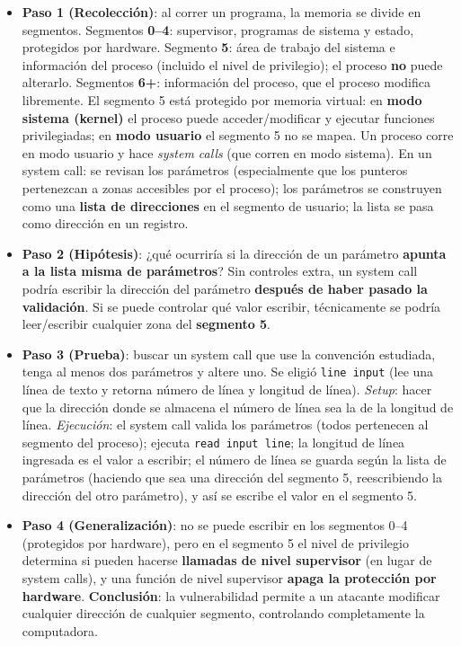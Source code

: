 \documentclass[../main.tex]{subfiles}
\begin{document}
\begin{itemize}
    \item \textbf{Paso 1 (Recolección)}: al correr un programa, la memoria se divide en
    segmentos. Segmentos \textbf{0--4}: supervisor, programas de sistema y estado, protegidos
    por hardware. Segmento \textbf{5}: área de trabajo del sistema e información del proceso
    (incluido el nivel de privilegio); el proceso \textbf{no} puede alterarlo. Segmentos
    \textbf{6+}: información del proceso, que el proceso modifica libremente. El segmento 5
    está protegido por memoria virtual: en \textbf{modo sistema (kernel)} el proceso puede
    acceder/modificar y ejecutar funciones privilegiadas; en \textbf{modo usuario} el segmento
    5 no se mapea. Un proceso corre en modo usuario y hace \emph{system calls} (que corren en
    modo sistema). En un system call: se revisan los parámetros (especialmente que los
    punteros pertenezcan a zonas accesibles por el proceso); los parámetros se construyen como
    una \textbf{lista de direcciones} en el segmento de usuario; la lista se pasa como
    dirección en un registro.
    \item \textbf{Paso 2 (Hipótesis)}: ¿qué ocurriría si la dirección de un parámetro
    \textbf{apunta a la lista misma de parámetros}? Sin controles extra, un system call podría
    escribir la dirección del parámetro \textbf{después de haber pasado la validación}. Si se
    puede controlar qué valor escribir, técnicamente se podría leer/escribir cualquier zona del
    \textbf{segmento 5}.
    \item \textbf{Paso 3 (Prueba)}: buscar un system call que use la convención estudiada,
    tenga al menos dos parámetros y altere uno. Se eligió \texttt{line input} (lee una línea de
    texto y retorna número de línea y longitud de línea). \emph{Setup}: hacer que la dirección
    donde se almacena el número de línea sea la de la longitud de línea. \emph{Ejecución}: el
    system call valida los parámetros (todos pertenecen al segmento del proceso); ejecuta
    \texttt{read input line}; la longitud de línea ingresada es el valor a escribir; el número
    de línea se guarda según la lista de parámetros (haciendo que sea una dirección del
    segmento 5, reescribiendo la dirección del otro parámetro), y así se escribe el valor en el
    segmento 5.
    \item \textbf{Paso 4 (Generalización)}: no se puede escribir en los segmentos 0--4
    (protegidos por hardware), pero en el segmento 5 el nivel de privilegio determina si pueden
    hacerse \textbf{llamadas de nivel supervisor} (en lugar de system calls), y una función de
    nivel supervisor \textbf{apaga la protección por hardware}. \textbf{Conclusión}: la
    vulnerabilidad permite a un atacante modificar cualquier dirección de cualquier segmento,
    controlando completamente la computadora.
\end{itemize}
\end{document}
